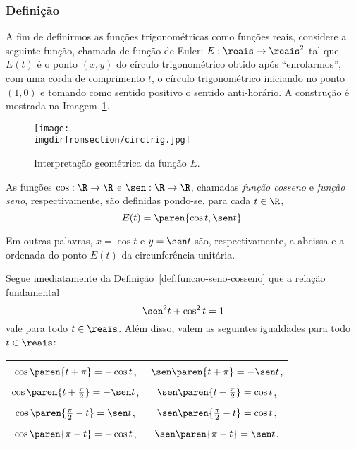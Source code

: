 \subsubsection{Definição}

A fim de definirmos as funções trigonométricas como funções
reais, considere a seguinte função, chamada de função de Euler: $E:
\reais \to \reais^2$ tal que $E(t)$ é o ponto $(x, y)$ do círculo
trigonométrico obtido após ``enrolarmos'', com uma corda de comprimento
$t$, o círculo trigonométrico iniciando no ponto $(1, 0)$ e tomando
como sentido positivo o sentido anti-horário. 
A construção é mostrada na Imagem~\ref{fig:ciclo-trigonometrico}.

\begin{figure}[H]
\centering
\texttt{[image: \\imgdirfromsection/circtrig.jpg]}
\caption{Interpretação geométrica da função $E$.}
\label{fig:ciclo-trigonometrico}
\end{figure}

\begin{definition}
\label{def:funcao-seno-cosseno}
	As funções $\cos : \R \to \R$ e $\sen : \R \to \R$, chamadas
\emph{função cosseno} e \emph{função seno}, respectivamente, são
definidas pondo-se, para cada $t \in \R$,
$$E(t) = \paren{\cos t , \sen t}.$$

Em outras palavras, $x= \cos t$ e $y = \sen t$ são, respectivamente,
a abcissa e a ordenada do ponto $E(t)$ da circunferência unitária.
\end{definition}

Segue imediatamente da Definição~\ref{def:funcao-seno-cosseno} que a
relação fundamental $$ \sen^2 t + \cos^2 t = 1$$ vale para todo $t
\in \reais$.
Além disso, valem as seguintes igualdades para todo $t \in \reais$:
\begin{center}
\begin{tabular}{ c c }
	$\cos \paren{t+ \pi} = -\cos t$, & $\sen \paren{t+ \pi} = -\sen t$, \\
	$\cos \paren{t+ \frac {\pi} 2} = -\sen t$, & $\sen \paren{t+ \frac {\pi} 2} = \cos t$, \\
	$\cos \paren{ \frac {\pi} 2 -t} = \sen t$, & $\sen \paren{ \frac {\pi} 2 -t} = \cos t$, \\
	$\cos \paren{ \pi -t} = -\cos t$, & $\sen \paren{ \pi -t} = \sen t$. \\
  \end{tabular}
\end{center}

